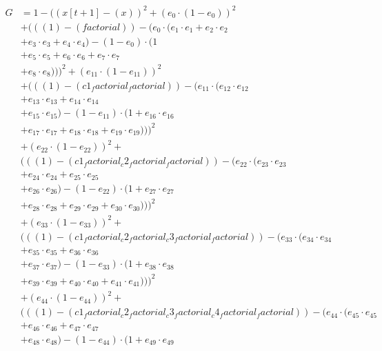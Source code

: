 \documentclass[10pt, a4paper]{article}
\begin{document}
\begin{small}
\begin{align*}
G &= 1 - ((x[t+1] - (x))^{2} + (e_{0} \cdot (1 - e_{0}))^{2} \\
& + (((1) - (factorial)) - (e_{0} \cdot (e_{1} \cdot e_{1} + e_{2} \cdot e_{2} \\
& + e_{3} \cdot e_{3} + e_{4} \cdot e_{4}) - (1 - e_{0}) \cdot (1 \\
& + e_{5} \cdot e_{5} + e_{6} \cdot e_{6} + e_{7} \cdot e_{7} \\
& + e_{8} \cdot e_{8})))^{2} + (e_{11} \cdot (1 - e_{11}))^{2} \\
& + (((1) - (c1_factorial_factorial)) - (e_{11} \cdot (e_{12} \cdot e_{12} \\
& + e_{13} \cdot e_{13} + e_{14} \cdot e_{14} \\
& + e_{15} \cdot e_{15}) - (1 - e_{11}) \cdot (1 + e_{16} \cdot e_{16} \\
& + e_{17} \cdot e_{17} + e_{18} \cdot e_{18} + e_{19} \cdot e_{19})))^{2} \\
& + (e_{22} \cdot (1 - e_{22}))^{2} + \\
& (((1) - (c1_factorial_c2_factorial_factorial)) - (e_{22} \cdot (e_{23} \cdot e_{23} \\
& + e_{24} \cdot e_{24} + e_{25} \cdot e_{25} \\
& + e_{26} \cdot e_{26}) - (1 - e_{22}) \cdot (1 + e_{27} \cdot e_{27} \\
& + e_{28} \cdot e_{28} + e_{29} \cdot e_{29} + e_{30} \cdot e_{30})))^{2} \\
& + (e_{33} \cdot (1 - e_{33}))^{2} + \\
& (((1) - (c1_factorial_c2_factorial_c3_factorial_factorial)) - (e_{33} \cdot (e_{34} \cdot e_{34} \\
& + e_{35} \cdot e_{35} + e_{36} \cdot e_{36} \\
& + e_{37} \cdot e_{37}) - (1 - e_{33}) \cdot (1 + e_{38} \cdot e_{38} \\
& + e_{39} \cdot e_{39} + e_{40} \cdot e_{40} + e_{41} \cdot e_{41})))^{2} \\
& + (e_{44} \cdot (1 - e_{44}))^{2} + \\
& (((1) - (c1_factorial_c2_factorial_c3_factorial_c4_factorial_factorial)) - (e_{44} \cdot (e_{45} \cdot e_{45} \\
& + e_{46} \cdot e_{46} + e_{47} \cdot e_{47} \\
& + e_{48} \cdot e_{48}) - (1 - e_{44}) \cdot (1 + e_{49} \cdot e_{49} \\

\end{align*}
\end{small}
\end{document}
